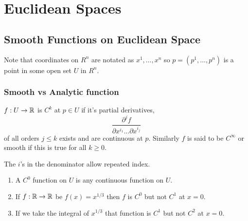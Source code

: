 \chapter{Euclidean Spaces}

\section{Smooth Functions on Euclidean Space}
Note that coordinates on $R^{n}$ are notated as $x^{1}, \dots, x^{n}$ so $p = (p^{1}, \dots, p^{n})$ is a point in some open set $U$ in $R^{n}$.

\subsection{Smooth vs Analytic function}
\begin{definition}
  $f:U \to \mathbb{R}$ is $C^{k}$ at $p \in U$ if it's partial derivatives, 
  \[
    \frac{\partial^{j} f}{\partial x^{i_{1}} \dots \partial x^{i_j}}
  \]
  of all orders $j \le k$ exists and are continuous at $p$. Similarly $f$ is said to be $C^{\infty}$ or smooth if this is true for all $k \ge 0$.
\end{definition}
\begin{note}
 The $i$'s in the denominator allow repeated index. 
\end{note}
\begin{eg}
  \begin{enumerate}
    \item A $C^{0}$ function  on $U$ is any continuous function on $U$.
    \item If $f: \mathbb{R} \to \mathbb{R}$ be $f(x) = x^{1 / 3}$ then $f$ is $C^{0}$ but not $C^{1}$ at $x = 0$.
    \item If we take the integral of $x^{1 / 3}$ that function is $C^{1}$ but not $C^2$ at $x = 0$.
  \end{enumerate}
\end{eg}



